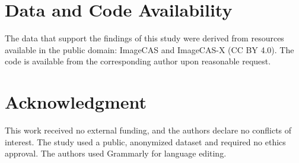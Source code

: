 \documentclass[journal,twoside,web]{ieeecolor}
\begin{document}
\section*{Data and Code Availability}
The data that support the findings of this study were derived from resources available in the public domain: ImageCAS \cite{zeng2023} and ImageCAS-X \cite{imagecasx_data} (CC BY 4.0). The code is available from the corresponding author upon reasonable request.

\section*{Acknowledgment}
This work received no external funding, and the authors declare no conflicts of interest. The study used a public, anonymized dataset \cite{zeng2023} and required no ethics
approval. The authors used Grammarly for language editing.



\end{document}
